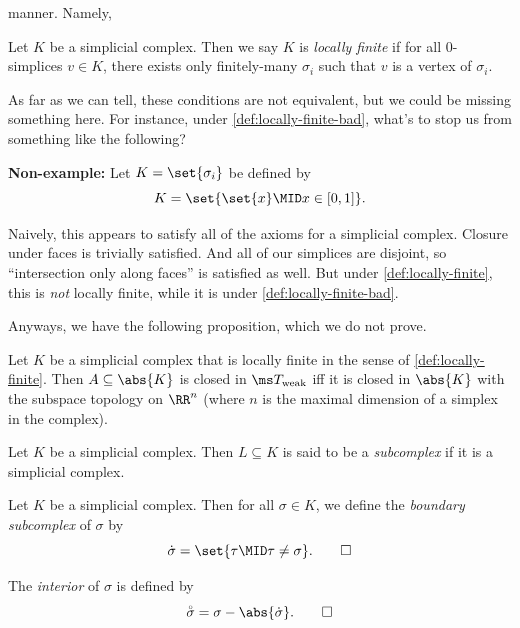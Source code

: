 manner. Namely,
\begin{definition}\label{def:locally-finite-bad}
  Let $K$ be a simplicial complex. Then we say $K$ is \emph{locally
    finite} if for all $0$-simplices $v \in K$, there exists only
  finitely-many $\sigma_i$ such that $v$ is a vertex of $\sigma_i$.
\end{definition}
As far as we can tell, these conditions are not equivalent, but we
could be missing something here. For instance, under
\cref{def:locally-finite-bad}, what's to stop us from something like
the following?
\begin{leftbar}
  \textbf{Non-example:} Let $K = \set{\sigma_i}$ be defined by
  \[
    K = \set{\set{x} \MID x \in [0,1]}.
  \]
\end{leftbar}
Naively, this appears to satisfy all of the axioms for a simplicial
complex. Closure under faces is trivially satisfied. And all of our
simplices are disjoint, so ``intersection only along faces'' is
satisfied as well. But under \cref{def:locally-finite}, this is
\emph{not} locally finite, while it is under
\cref{def:locally-finite-bad}.

Anyways, we have the following proposition, which we do not prove.
\begin{proposition}
  Let $K$ be a simplicial complex that is locally finite in the sense
  of \cref{def:locally-finite}. Then $A \subseteq \abs{K}$ is closed
  in $\ms T_{\rm weak}$ iff it is closed in $\abs{K}$ with the
  subspace topology on $\RR^n$ (where $n$ is the maximal dimension of
  a simplex in the complex).
\end{proposition}

\begin{definition}[Subcomplex]
  Let $K$ be a simplicial complex. Then $L \subseteq K$ is said to be
  a \emph{subcomplex} if it is a simplicial complex.
\end{definition}
\begin{definition}
  Let $K$ be a simplicial complex. Then for all $\sigma \in K$, we
  define the \emph{boundary subcomplex} of $\sigma$ by
  \[
    \dot{\sigma} = \set{\tau \MID \tau \neq \sigma}. \qedhere
  \]
\end{definition}
\begin{definition}[Interior]
  The \emph{interior} of $\sigma$ is defined by
  \[
    \accentset{\circ}{\sigma} = \sigma - \abs{\dot{\sigma}}. \qedhere
  \]
\end{definition}

